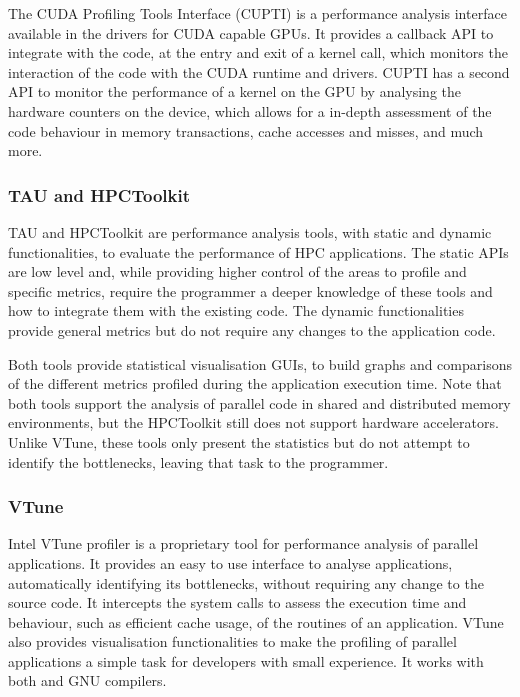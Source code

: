 The \nvidia CUDA Profiling Tools Interface (CUPTI) \cite{NVIDIA:CUPTI} is a performance analysis interface available in the \nvidia drivers for CUDA capable GPUs. It provides a callback API to integrate with the code, at the entry and exit of a kernel call, which monitors the interaction of the code with the CUDA runtime and drivers. CUPTI has a second API to monitor the performance of a kernel on the GPU by analysing the hardware counters on the device, which allows for a in-depth assessment of the code behaviour in memory transactions, cache accesses and misses, and much more.

\subsubsection*{TAU and HPCToolkit}

TAU \cite{TAU} and HPCToolkit \cite{HPCToolkit} are performance analysis tools, with static and dynamic functionalities, to evaluate the performance of HPC applications. The static APIs are low level and, while providing higher control of the areas to profile and specific metrics, require the programmer a deeper knowledge of these tools and how to integrate them with the existing code. The dynamic functionalities provide general metrics but do not require any changes to the application code.

Both tools provide statistical visualisation GUIs, to build graphs and comparisons of the different metrics profiled during the application execution time. Note that both tools support the analysis of parallel code in shared and distributed memory environments, but the HPCToolkit still does not support hardware accelerators. Unlike VTune, these tools only present the statistics but do not attempt to identify the bottlenecks, leaving that task to the programmer.

\subsubsection*{VTune}

Intel VTune profiler \cite{Intel:VTune} is a proprietary tool for performance analysis of parallel applications. It provides an easy to use interface to analyse applications, automatically identifying its bottlenecks, without requiring any change to the source code. It intercepts the system calls to assess the execution time and behaviour, such as efficient cache usage, of the routines of an application. VTune also provides visualisation functionalities to make the profiling of parallel applications a simple task for developers with small experience. It works with both \intel and GNU compilers.

